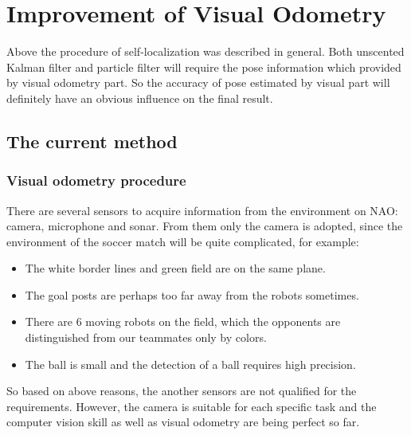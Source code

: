 \chapter{Improvement of Visual Odometry}\label{Chap:Imp}
Above the procedure of self-localization was described in general. Both unscented Kalman filter and particle filter will require the pose information which provided by visual odometry part. So the accuracy of pose estimated by visual part will definitely have an obvious influence on the final result.
\clearpage
\section{The current method}
\subsection{Visual odometry procedure}
There are several sensors to acquire information from the environment on NAO: camera, microphone and sonar. From them only the camera is adopted, since the environment of the soccer match will be quite complicated, for example:
\begin{itemize}
    \item The white border lines and green field are on the same plane.
    \item The goal posts are perhaps too far away from the robots sometimes.
    \item There are 6 moving robots on the field, which the opponents are distinguished from our teammates only by colors.
    \item The ball is small and the detection of a ball requires high precision.
\end{itemize}
So based on above reasons, the another sensors are not qualified for the requirements. However, the camera is suitable for each specific task and the computer vision skill as well as visual odometry are being perfect so far.

